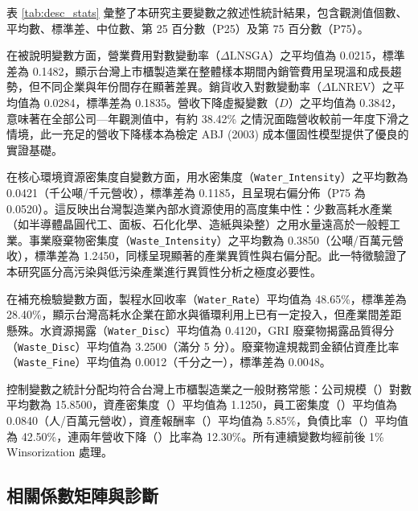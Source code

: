 \documentclass[12pt,a4paper]{article}
\begin{document}
表 \ref{tab:desc_stats} 彙整了本研究主要變數之敘述性統計結果，包含觀測值個數、平均數、標準差、中位數、第 25 百分數（P25）及第 75 百分數（P75）。

在被說明變數方面，營業費用對數變動率（$\Delta\text{LNSGA}$）之平均值為 0.0215，標準差為 0.1482，顯示台灣上市櫃製造業在整體樣本期間內銷管費用呈現溫和成長趨勢，但不同企業與年份間存在顯著差異。銷貨收入對數變動率（$\Delta\text{LNREV}$）之平均值為 0.0284，標準差為 0.1835。營收下降虛擬變數（$D$）之平均值為 0.3842，意味著在全部公司—年觀測值中，有約 38.42\% 之情況面臨營收較前一年度下滑之情境，此一充足的營收下降樣本為檢定 ABJ (2003) 成本僵固性模型提供了優良的實證基礎。

在核心環境資源密集度自變數方面，用水密集度（\texttt{Water\_Intensity}）之平均數為 0.0421（千公噸/千元營收），標準差為 0.1185，且呈現右偏分佈（P75 為 0.0520）。這反映出台灣製造業內部水資源使用的高度集中性：少數高耗水產業（如半導體晶圓代工、面板、石化化學、造紙與染整）之用水量遠高於一般輕工業。事業廢棄物密集度（\texttt{Waste\_Intensity}）之平均數為 0.3850（公噸/百萬元營收），標準差為 1.2450，同樣呈現顯著的產業異質性與右偏分配。此一特徵驗證了本研究區分高污染與低污染產業進行異質性分析之極度必要性。

在補充檢驗變數方面，製程水回收率（\texttt{Water\_Rate}）平均值為 48.65\%，標準差為 28.40\%，顯示台灣高耗水企業在節水與循環利用上已有一定投入，但產業間差距懸殊。水資源揭露（\texttt{Water\_Disc}）平均值為 0.4120，GRI 廢棄物揭露品質得分（\texttt{Waste\_Disc}）平均值為 3.2500（滿分 5 分）。廢棄物違規裁罰金額佔資產比率（\texttt{Waste\_Fine}）平均值為 0.0012（千分之一），標準差為 0.0048。

控制變數之統計分配均符合台灣上市櫃製造業之一般財務常態：公司規模（）對數平均數為 15.8500，資產密集度（）平均值為 1.1250，員工密集度（）平均值為 0.0840（人/百萬元營收），資產報酬率（）平均值為 5.85\%，負債比率（）平均值為 42.50\%，連兩年營收下降（）比率為 12.30\%。所有連續變數均經前後 1\% Winsorization 處理。

\subsection{相關係數矩陣與診斷}
\end{document}
